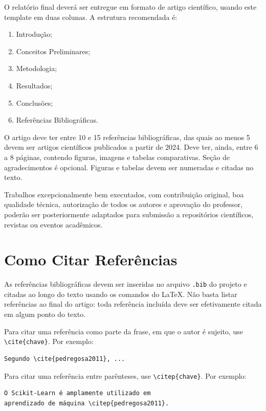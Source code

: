 \documentclass[a4paper]{ifacconf}
\begin{document}
O relatório final deverá ser entregue em formato de artigo científico, usando este template em duas colunas. A estrutura recomendada é:

\begin{enumerate}
    \item Introdução;
	\item Conceitos Preliminares; 
    \item Metodologia;
    \item Resultados;
    \item Conclusões;
    \item Referências Bibliográficas.     
\end{enumerate}

O artigo deve ter entre 10 e 15 referências bibliográficas, das quais ao menos 5 devem ser artigos científicos publicados a partir de 2024. Deve ter, ainda, entre 6 a 8 páginas, contendo figuras, imagens e tabelas comparativas. Seção de agradecimentos é opcional. Figuras e tabelas devem ser numeradas e citadas no texto.

Trabalhos excepcionalmente bem executados, com contribuição original, boa qualidade técnica, autorização de todos os autores e aprovação do professor, poderão ser posteriormente adaptados para submissão a repositórios científicos, revistas ou eventos acadêmicos.

\section{Como Citar Referências}

As referências bibliográficas devem ser inseridas no arquivo \texttt{.bib} do projeto e citadas ao longo do texto usando os comandos do \LaTeX. Não basta listar referências ao final do artigo: toda referência incluída deve ser efetivamente citada em algum ponto do texto.

Para citar uma referência como parte da frase, em que o autor é sujeito, use \texttt{\textbackslash cite\{chave\}}. Por exemplo:
\begin{verbatim}
Segundo \cite{pedregosa2011}, ...
\end{verbatim}

Para citar uma referência entre parênteses, use \texttt{\textbackslash citep\{chave\}}. Por exemplo:
\begin{verbatim}
O Scikit-Learn é amplamente utilizado em 
aprendizado de máquina \citep{pedregosa2011}.
\end{verbatim}
\end{document}
